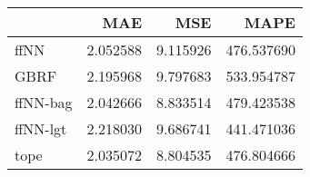 \begin{tabular}{lrrr}
\toprule
{} &       MAE &       MSE &        MAPE \\
\midrule
ffNN     &  2.052588 &  9.115926 &  476.537690 \\
GBRF     &  2.195968 &  9.797683 &  533.954787 \\
ffNN-bag &  2.042666 &  8.833514 &  479.423538 \\
ffNN-lgt &  2.218030 &  9.686741 &  441.471036 \\
tope     &  2.035072 &  8.804535 &  476.804666 \\
\bottomrule
\end{tabular}
